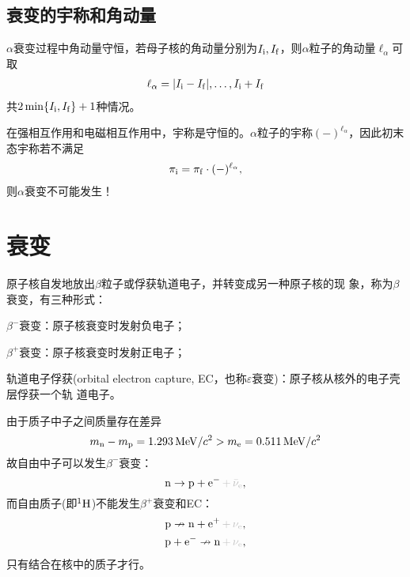 \subsection{\textalpha 衰变的宇称和角动量}

$\alpha$衰变过程中角动量守恒，若母子核的角动量分别为$I_{\mathrm{i}},I_{\mathrm{f}}$，则$\alpha$粒子的角动量$\ell_\alpha$可取
\begin{align}
	\ell_\alpha=|I_{\mathrm{i}}-I_{\mathrm{f}}|,\ldots,I_{\mathrm{i}}+I_{\mathrm{f}}
\end{align}
共$2\min\{I_{\mathrm{i}},I_{\mathrm{f}}\}+1$种情况。

在强相互作用和电磁相互作用中，宇称是守恒的。$\alpha$粒子的宇称$(-)^{\ell_\alpha}$，因此初末态宇称若不满足
\begin{align}
	\pi_{\mathrm{i}}=\pi_{\mathrm{f}}\cdot(-)^{\ell_\alpha},
\end{align}
则$\alpha$衰变不可能发生！

\section{\textbeta 衰变}

原子核自发地放出$\beta$粒子或俘获轨道电子，并转变成另一种原子核的现
象，称为$\beta$衰变，有三种形式：
\begin{compactenum}
	\item $\beta^-$衰变：原子核衰变时发射负电子；
	\item $\beta^+$衰变：原子核衰变时发射正电子；
	\item 轨道电子俘获(orbital electron capture, EC，也称$\varepsilon$衰变)：原子核从核外的电子壳层俘获一个轨
	道电子。
\end{compactenum}

由于质子中子之间质量存在差异
\[
	m_\nton - m_\pton = \SI{1.293}{\MeV}/c^2 > m_\elc = \SI{0.511}{MeV}/c^2
\]
故自由中子可以发生$\beta^-$衰变：
\[
	\nton\to\pton+\elc^-\textcolor{lightgray}{\,+\,\bar\nu_\elc},
\]
而自由质子(即${^{1}\mathrm{H}}$)不能发生$\beta^+$衰变和EC：
\begin{gather*}
	\pton\nrightarrow \nton+\elc^+\textcolor{lightgray}{\,+\,\nu_\elc},\\
	\pton+\elc^-\nrightarrow \nton\textcolor{lightgray}{\,+\,\nu_\elc},
\end{gather*}
只有结合在核中的质子才行。

